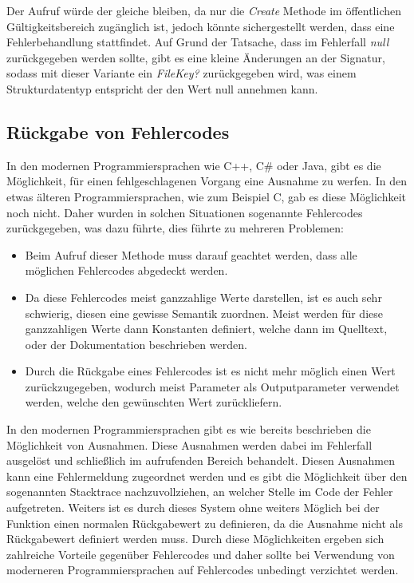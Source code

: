 \SuperPar Der Aufruf würde der gleiche bleiben, da nur die \textit{Create} Methode im öffentlichen Gültigkeitsbereich zugänglich ist, jedoch könnte sichergestellt werden, dass eine Fehlerbehandlung stattfindet. Auf Grund der Tatsache, dass im Fehlerfall \textit{null} zurückgegeben werden sollte, gibt es eine kleine Änderungen an der Signatur, sodass mit dieser Variante ein \textit{FileKey?} zurückgegeben wird, was einem Strukturdatentyp entspricht der den Wert null annehmen kann. 

\subsection{Rückgabe von Fehlercodes}

\SuperPar In den modernen Programmiersprachen wie C++, C\# oder Java, gibt es die Möglichkeit, für einen fehlgeschlagenen Vorgang eine Ausnahme zu werfen. In den etwas älteren Programmiersprachen, wie zum Beispiel C, gab es diese Möglichkeit noch nicht. Daher wurden in solchen Situationen sogenannte Fehlercodes zurückgegeben, was dazu führte, dies führte zu mehreren Problemen: 

\begin{itemize}
	\item Beim Aufruf dieser Methode muss darauf geachtet werden, dass alle möglichen Fehlercodes abgedeckt werden. 
	\item Da diese Fehlercodes meist ganzzahlige Werte darstellen, ist es auch sehr schwierig, diesen eine gewisse Semantik zuordnen. Meist werden für diese ganzzahligen Werte dann Konstanten definiert, welche dann im Quelltext, oder der Dokumentation beschrieben werden. 
	\item Durch die Rückgabe eines Fehlercodes ist es nicht mehr möglich einen Wert zurückzugegeben, wodurch meist Parameter als Outputparameter verwendet werden, welche den gewünschten Wert zurückliefern.
\end{itemize}

\SuperPar In den modernen Programmiersprachen gibt es wie bereits beschrieben die Möglichkeit von Ausnahmen. Diese Ausnahmen werden dabei im Fehlerfall ausgelöst und schließlich im aufrufenden Bereich behandelt. Diesen Ausnahmen kann eine Fehlermeldung zugeordnet werden und es gibt die Möglichkeit über den sogenannten Stacktrace nachzuvollziehen, an welcher Stelle im Code der Fehler aufgetreten. Weiters ist es durch dieses System ohne weiters Möglich bei der Funktion einen normalen Rückgabewert zu definieren, da die Ausnahme nicht als Rückgabewert definiert werden muss. Durch diese Möglichkeiten ergeben sich zahlreiche Vorteile gegenüber Fehlercodes und daher sollte bei Verwendung von moderneren Programmiersprachen auf Fehlercodes unbedingt verzichtet werden.

